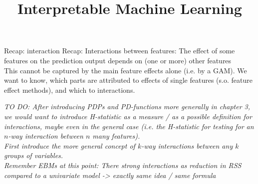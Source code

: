 \documentclass[11pt,compress,t,notes=noshow, aspectratio=169, xcolor=table]{beamer}
\title{Interpretable Machine Learning}
\date{}
\begin{document}

\newcommand{\titlefigure}{figure/open_blackbox}
\newcommand{\learninggoals}{
\item Basic idea of additive functional decompositions
\item Motivation and usefulness of functional decompositions
\item Difficulty of obtaining or even defining a functional decomposition}



\begin{frame}{Recap: interaction}
    Recap: Interactions between features: The effect of some features on the prediction output depends on (one or more) other features \\
    This cannot be captured by the main feature effects alone (i.e. by a GAM).
    We want to know, which parts are attributed to effects of single features (s.o. feature effect methods), and which to interactions.

    \textit{
    TO DO: After introducing PDPs and PD-functions more generally in chapter 3, we would want to introduce H-statistic as a measure / as a possible definition for interactions, maybe even in the general case (i.e. the H-statistic for testing for an \(n\)-way interaction between \(n\) many features). \\
    First introduce the more general concept of \(k\)-way interactions between any \(k\) groups of variables. \\
    Remember EBMs at this point: There strong interactions as reduction in RSS compared to a univariate model -> exactly same idea / same formula
    }

\end{frame}
\end{document}
